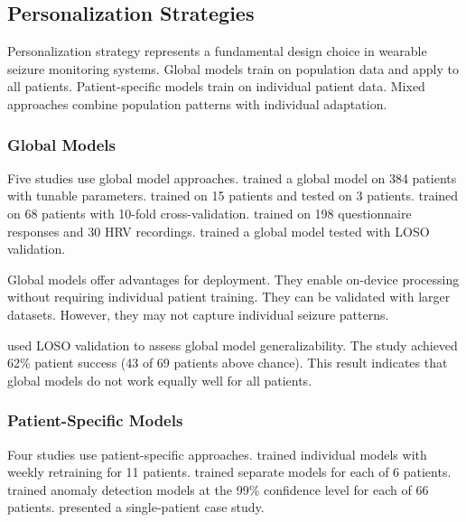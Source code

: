 \subsection{Personalization Strategies}

Personalization strategy represents a fundamental design choice in wearable seizure monitoring systems. Global models train on population data and apply to all patients. Patient-specific models train on individual patient data. Mixed approaches combine population patterns with individual adaptation.

\subsubsection{Global Models}

Five studies use global model approaches. \textcite{spahrDeepLearningbasedDetection2025} trained a global model on 384 patients with tunable parameters. \textcite{fineWearableDeviceSeizure2025} trained on 15 patients and tested on 3 patients. \textcite{dongTwoLayerEnsembleMethod2022} trained on 68 patients with 10-fold cross-validation. \textcite{elemamAutomatedValidatedTool2025} trained on 198 questionnaire responses and 30 HRV recordings. \textcite{meiselMachineLearningWristband2020} trained a global model tested with LOSO validation.

Global models offer advantages for deployment. They enable on-device processing without requiring individual patient training. They can be validated with larger datasets. However, they may not capture individual seizure patterns.

\textcite{meiselMachineLearningWristband2020} used LOSO validation to assess global model generalizability. The study achieved 62\% patient success (43 of 69 patients above chance). This result indicates that global models do not work equally well for all patients.

\subsubsection{Patient-Specific Models}

Four studies use patient-specific approaches. \textcite{stirlingForecastingSeizureLikelihood2021} trained individual models with weekly retraining for 11 patients. \textcite{nasseriAmbulatorySeizureForecasting2021} trained separate models for each of 6 patients. \textcite{odeDevelopmentEpilepticSeizure2023} trained anomaly detection models at the 99\% confidence level for each of 66 patients. \textcite{singhRathoreWearableBasedEpileptic2024} presented a single-patient case study.

